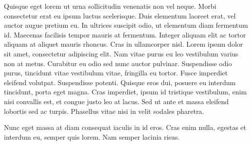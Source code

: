 \documentclass[a4paper]{article}
\begin{document}
Quisque eget lorem ut urna sollicitudin venenatis non vel neque. Morbi
consectetur erat eu ipsum luctus scelerisque. Duis elementum laoreet
erat, vel auctor augue pretium eu. In ultrices suscipit odio, ut
elementum diam fermentum id. Maecenas facilisis tempor mauris at
fermentum. Integer aliquam elit ac tortor aliquam at aliquet mauris
rhoncus. Cras in ullamcorper nisl. Lorem ipsum dolor sit amet,
consectetur adipiscing elit. Nam vitae purus eu leo vestibulum varius
non at metus. Curabitur eu odio sed nunc auctor pulvinar. Suspendisse
odio purus, tincidunt vitae vestibulum vitae, fringilla eu
tortor. Fusce imperdiet eleifend volutpat. Suspendisse
potenti. Quisque eros dui, posuere eu interdum tincidunt, porta eget
magna. Cras imperdiet, ipsum id tristique vestibulum, enim nisi
convallis est, et congue justo leo at lacus. Sed ut ante et massa
eleifend lobortis sed ac turpis. Phasellus vitae nisi in velit sodales
pharetra.

Nunc eget massa at diam consequat iaculis in id eros. Cras enim nulla,
egestas et interdum eu, semper quis lorem. Nam semper lacinia risus.
\end{document}
